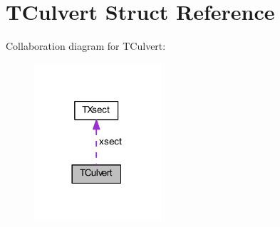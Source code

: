 \hypertarget{struct_t_culvert}{}\section{T\+Culvert Struct Reference}
\label{struct_t_culvert}


Collaboration diagram for T\+Culvert\+:
\nopagebreak
\begin{figure}[H]
\begin{center}
\leavevmode
\includegraphics[width=134pt]{da/dd6/struct_t_culvert__coll__graph}
\end{center}
\end{figure}
